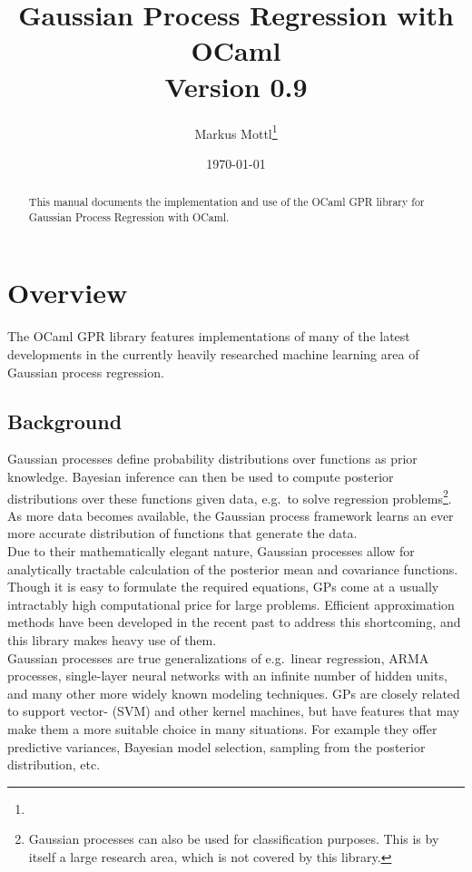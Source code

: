 \documentclass[10pt]{article}
\title{Gaussian Process Regression with OCaml\\Version 0.9}
\author{Markus Mottl\footnote{\mail}}
\date{\today}
\begin{document}
\maketitle

\begin{abstract}

This manual documents the implementation and use of the OCaml GPR
library for Gaussian Process Regression with OCaml.

\end{abstract}

\section{Overview}

The OCaml GPR library features implementations of many of the latest
developments in the currently heavily researched machine learning
area of Gaussian process regression.

\subsection{Background}

Gaussian processes define probability distributions over functions
as prior knowledge.  Bayesian inference can then be used to compute
posterior distributions over these functions given data, e.g.\ to
solve regression problems\footnote{Gaussian processes can also be
used for classification purposes.  This is by itself a large research
area, which is not covered by this library.}.  As more data becomes
available, the Gaussian process framework learns an ever more
accurate distribution of functions that generate the data.\\

Due to their mathematically elegant nature, Gaussian processes allow
for analytically tractable calculation of the posterior mean and
covariance functions.  Though it is easy to formulate the required
equations, GPs come at a usually intractably high computational
price for large problems.  Efficient approximation methods have
been developed in the recent past to address this shortcoming, and
this library makes heavy use of them.\\

Gaussian processes are true generalizations of e.g.\ linear regression,
ARMA processes, single-layer neural networks with an infinite number
of hidden units, and many other more widely known modeling techniques.
GPs are closely related to support vector- (SVM) and other kernel
machines, but have features that may make them a more suitable
choice in many situations.  For example they offer predictive
variances, Bayesian model selection, sampling from the posterior
distribution, etc.\\
\end{document}
